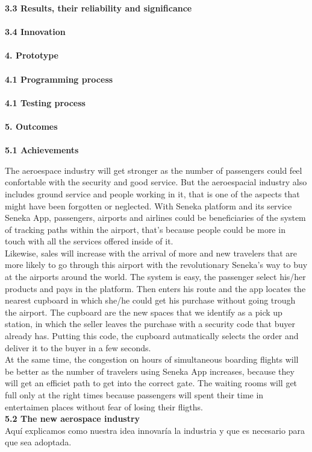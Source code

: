 \documentclass[]{article}
\begin{document}
\Large{\textbf{3.3 Results, their reliability and significance}\\}\\


\Large{\textbf{3.4 Innovation}\\}\\


\Large{\textbf{4. Prototype}\\}\\


\Large{\textbf{4.1 Programming process}\\}\\


\Large{\textbf{4.1 Testing process}\\}\\


\Large{\textbf{5. Outcomes}\\}\\

\Large{\textbf{5.1 Achievements}\\}

The aeroespace industry will get stronger as the number of passengers could feel confortable with the security and good service. But the aeroespacial industry also includes ground service and people working in it, that is one of the aspects that might have been forgotten or neglected. With Seneka platform and its service Seneka App, passengers, airports and airlines could be beneficiaries of the system of tracking paths within the airport, that's because people could be more in touch with all the services offered inside of it.\\

Likewise, sales will increase with the arrival of more and new travelers that are more likely to go through this airport with the revolutionary Seneka's way to buy at the airports around the world. The system is easy, the passenger select his/her products and pays in the platform. Then enters his route and the app locates the nearest cupboard in which she/he could get his purchase without going trough the airport. The cupboard are the new spaces that we identify as a pick up station, in which the seller leaves the purchase with a security code that buyer already has. Putting this code, the cupboard autmatically selects the order and deliver it to the buyer in a few seconds.\\

At the same time, the congestion on hours of simultaneous boarding flights will be better as the number of travelers using Seneka App increases, because they will get an efficiet path to get into the correct gate. The waiting rooms will get full only at the right times because passengers will spent their time in entertaimen places without fear of losing their fligths.\\

\Large{\textbf{5.2 The new aerospace industry}\\}
Aquí explicamos como nuestra idea innovaría la industria y que es necesario para que sea adoptada.
\end{document}
